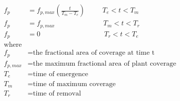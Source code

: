 \documentclass[fleqn, oneside, 11pt]{article}%
\begin{document}
\begin{preview}
\begin{align*}%
f_{p} & = f_{p, max}(\frac{t}{T_{m}-T_{e}}) \;\;\;\;\;\;\;\;\; T_{e}<t<T_{m} \nonumber \\ 
f_{p} & = f_{p, max} \;\;\;\;\;\;\;\;\;\;\;\;\;\;\;\;\;\;\;\;\;\;\;\;\; T_{m}<t<T_{r} \\ 
f_{p} & = 0 \;\;\;\;\;\;\;\;\;\;\;\;\;\;\;\;\;\;\;\;\;\;\;\;\;\;\;\;\;\;\;\;\; T_{r}<t<T_{e} \nonumber \\
\text{where} \nonumber \\
f_{p} & =  \text{the fractional area of coverage at time t} \nonumber \\
f_{p, max} & =  \text{the maximum fractional area of plant coverage} \nonumber \\
T_{e} & =  \text{time of emergence} \nonumber \\
T_{m} & =  \text{time of maximum coverage} \nonumber \\
T_{r} & =  \text{time of removal} \nonumber \\
\end{align*} 
\end{preview}
\end{document}
